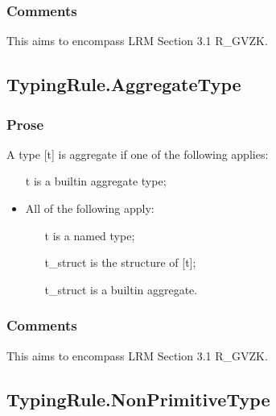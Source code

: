 \documentclass{book}
\begin{document}
    \subsubsection{Comments}
    This aims to encompass LRM Section 3.1 R\_GVZK.

\subsection{TypingRule.AggregateType}

    \subsubsection{Prose}
    A type [t] is aggregate if one of the following applies:
    \begin{itemize}
    \item  [t] is a builtin aggregate type;
    \item  All of the following apply:
      \begin{itemize}
      \item  [t] is a named type;
      \item  [t\_struct] is the structure of [t];
      \item  [t\_struct] is a builtin aggregate. 
      \end{itemize}
    \end{itemize}

    \subsubsection{Comments}
    This aims to encompass LRM Section 3.1 R\_GVZK.

\subsection{TypingRule.NonPrimitiveType}
\end{document}
